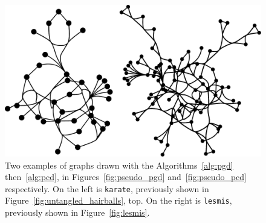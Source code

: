 \begin{figure}
  \centering
  \includegraphics[width=\linewidth]{power/power_karate_lesmis.pdf}
  \caption[Examples of networks drawn with the power-confluent algorithm]{Two examples of graphs drawn with the Algorithms~\ref{alg:pgd} then~\ref{alg:pcd}, in Figures~\ref{fig:pseudo_pgd} and~\ref{fig:pseudo_pcd} respectively. On the left is \texttt{karate}, previously shown in Figure~\ref{fig:untangled_hairballs}, top. On the right is \texttt{lesmis}, previously shown in Figure~\ref{fig:lesmis}.}
  \label{fig:power_karate_lesmis}
\end{figure}